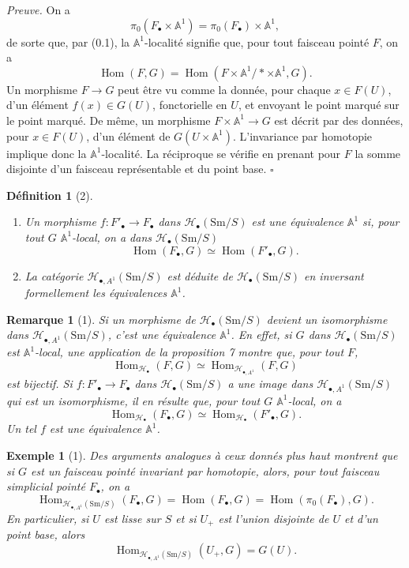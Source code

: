 \documentclass[11pt]{article}
\newcommand{\Aone}{\mathbb A^1}
\newcommand{\Sm}{\mathrm{Sm}}
\newcommand{\Hom}{\operatorname{Hom}}
\newcommand{\Hob}{\mathcal H_\bullet}
\newcommand{\HoA}{\mathcal H_{\bullet,A^1}}
\newcommand{\pt}{*}
\theoremstyle{deligne}
\newtheorem*{definition*}{Définition}
\newtheorem*{remark*}{Remarque}
\newtheorem*{example*}{Exemple}
\newenvironment{proofdel}{\noindent\textit{Preuve.}}{\hfill$\square$}
\begin{document}
\begin{proofdel}
On a
\[
  \pi_0(F_\bullet\times\Aone)=\pi_0(F_\bullet)\times\Aone,
\]
de sorte que, par (0.1), la \(\Aone\)-localité signifie que, pour tout faisceau pointé \(F\), on a
\[
  \Hom(F,G)=\Hom(F\times\Aone/\pt\times\Aone,G).
\]
Un morphisme \(F\to G\) peut être vu comme la donnée, pour chaque \(x\in F(U)\), d'un élément \(f(x)\in G(U)\), fonctorielle en \(U\), et envoyant le point marqué sur le point marqué. De même, un morphisme \(F\times\Aone\to G\) est décrit par des données, pour \(x\in F(U)\), d'un élément de \(G(U\times\Aone)\). L'invariance par homotopie implique donc la \(\Aone\)-localité. La réciproque se vérifie en prenant pour \(F\) la somme disjointe d'un faisceau représentable et du point base.
\end{proofdel}

\begin{definition*}[2]
\begin{enumerate}[label=(\arabic*)]
\item Un morphisme \(f:F'_\bullet\to F_\bullet\) dans \(\Hob(\Sm/S)\) est une équivalence \(\Aone\) si, pour tout \(G\) \(\Aone\)-local, on a dans \(\Hob(\Sm/S)\)
\[
  \Hom(F_\bullet,G)\simeq \Hom(F'_\bullet,G).
\]
\item La catégorie \(\HoA(\Sm/S)\) est déduite de \(\Hob(\Sm/S)\) en inversant formellement les équivalences \(\Aone\).
\end{enumerate}
\end{definition*}

\begin{remark*}[1]
Si un morphisme de \(\Hob(\Sm/S)\) devient un isomorphisme dans \(\HoA(\Sm/S)\), c'est une équivalence \(\Aone\). En effet, si \(G\) dans \(\Hob(\Sm/S)\) est \(\Aone\)-local, une application de la proposition 7 montre que, pour tout \(F\),
\[
  \Hom_{\Hob}(F,G)\simeq \Hom_{\HoA}(F,G)
\]
est bijectif. Si \(f:F'_\bullet\to F_\bullet\) dans \(\Hob(\Sm/S)\) a une image dans \(\HoA(\Sm/S)\) qui est un isomorphisme, il en résulte que, pour tout \(G\) \(\Aone\)-local, on a
\[
  \Hom_{\Hob}(F_\bullet,G)\simeq \Hom_{\Hob}(F'_\bullet,G).
\]
Un tel \(f\) est une équivalence \(\Aone\).
\end{remark*}

\begin{example*}[1]
Des arguments analogues à ceux donnés plus haut montrent que si \(G\) est un faisceau pointé invariant par homotopie, alors, pour tout faisceau simplicial pointé \(F_\bullet\), on a
\[
  \Hom_{\HoA(\Sm/S)}(F_\bullet,G)
  =\Hom(F_\bullet,G)=\Hom(\pi_0(F_\bullet),G).
\]
En particulier, si \(U\) est lisse sur \(S\) et si \(U_+\) est l'union disjointe de \(U\) et d'un point base, alors
\[
  \Hom_{\HoA(\Sm/S)}(U_+,G)=G(U).
\]
\end{example*}
\end{document}
